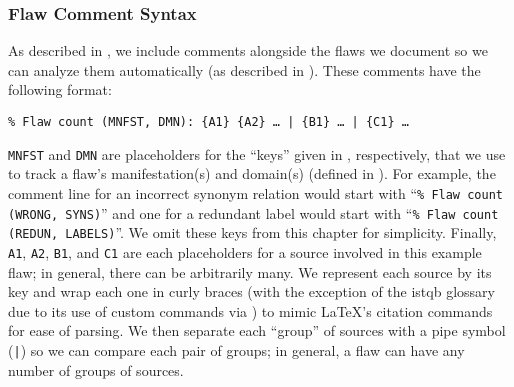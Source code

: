 \subsubsection{Flaw Comment Syntax}\label{flaw-comment-syntax}
As described in , we include comments alongside the flaws we
document so we can analyze them automatically (as described in
). These comments have the following format:
\begin{displayquote}
    \texttt{\% Flaw count (MNFST, DMN): \{A1\} \{A2\} \dots{} | \{B1\} %
        \dots{} | \{C1\} \dots}
\end{displayquote}
\texttt{MNFST} and \texttt{DMN} are placeholders for the ``keys'' given in
, respectively, that we use to
track a flaw's manifestation(s) and domain(s) (defined in ).
For example, the comment line for an incorrect synonym relation would start
with ``\texttt{\% Flaw count (WRONG, SYNS)}'' and one for a redundant label would
start with ``\texttt{\% Flaw count (REDUN, LABELS)}''. We omit these keys from
this chapter for simplicity. Finally, \texttt{A1}, \texttt{A2}, %
\texttt{B1}, and \texttt{C1} are each placeholders for a source involved in
this example flaw; in general, there can be arbitrarily many. We represent
each source by its \BibTeX{} key and wrap each one in curly braces (with
the exception of the \acs{istqb} glossary due to its use of custom commands
via ) to mimic \LaTeX{}'s citation commands for ease of
parsing. We then separate each ``group'' of sources with a pipe symbol
(\texttt{|}) so we can compare each pair of groups; in general, a flaw can
have any number of groups of sources.

